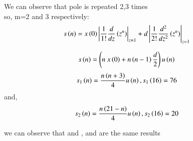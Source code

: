 \documentclass[beamer]{IEEEtran}
\theoremstyle{remark}
\begin{document}
We can observe that pole is repeated 2,3 times\\so, m=2 and 3 respectively:
\begin{align}
    s\left(n\right)&=x\left(0\right)\left|\frac{1}{1!}\frac{d}{dz}\left(z^n\right)\right|_{z=1} + d\left|\frac{1}{2!}\frac{d^2}{dz^2}\left(z^n\right)\right|_{z=1}
\end{align}

\begin{align}
    s\left(n\right)&=\left(n\ x\left(0\right) + n\left(n-1\right)\frac{d}{2}\right)u\left(n\right)
\end{align}
\begin{align}
\label{39}
    s_1\left(n\right)&=\frac{n\left(n+3\right)}{4}u\left(n\right),s_1\left(16\right)=76
\end{align}
and,
\begin{align}
\label{40}
    s_2\left(n\right)&=\frac{n\left(21-n\right)}{4}u\left(n\right),s_2\left(16\right)=20
\end{align}

we can observe that \brak{\ref{11}} and \brak{\ref{39}},\brak{\ref{12}} and \brak{\ref{40}} are the same results
\end{document}
